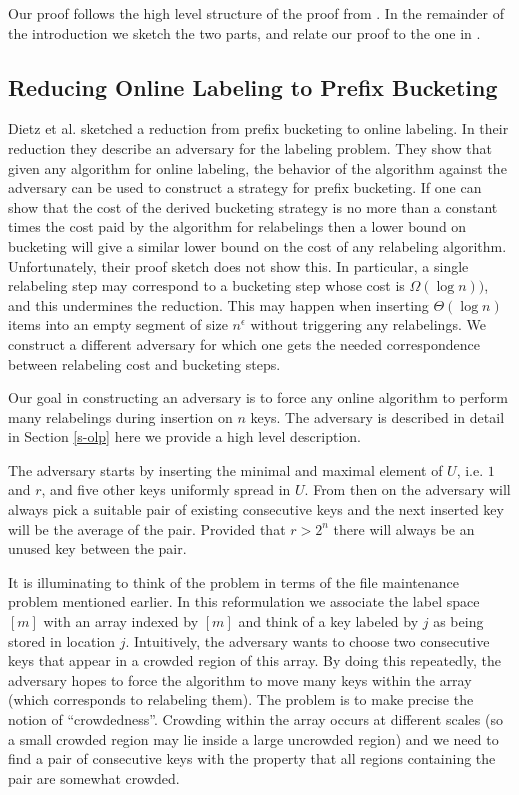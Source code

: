 \documentclass[11pt]{article}
\begin{document}
Our proof follows the high level structure of the proof from \cite{DSZ04}.  In the remainder of the introduction we sketch the two
parts, and relate our proof to the one in \cite{DSZ04}.

\subsection{Reducing Online Labeling to Prefix Bucketing}


Dietz et al. \cite{DSZ04} sketched a reduction from prefix bucketing to online labeling.  In their reduction they describe an adversary
for the labeling problem.  They show that given any algorithm for online labeling, the behavior of the algorithm
against the adversary can be used to construct a strategy for prefix bucketing.  If one can show that the cost of the derived bucketing strategy is no more than a constant times  the cost paid by the algorithm for relabelings then a lower bound on bucketing
will give a similar lower bound on the cost of any relabeling algorithm.  Unfortunately, their proof sketch does not show this.
In particular, a single relabeling step may correspond to a bucketing step whose cost is $\Omega(\log n))$, and this
undermines the reduction.
This may happen when inserting $\Theta(\log n)$ items into an empty segment of size $n^\epsilon$ without triggering any relabelings.
We construct a different adversary for which one gets the needed correspondence
between relabeling cost and bucketing steps.

Our goal in constructing an adversary is to force any online algorithm to perform many relabelings during insertion on $n$ keys.
The adversary is described
in detail in Section \ref{s-olp} here we provide a high level description.

The adversary starts by inserting the minimal and maximal element of $U$, i.e. $1$ and $r$, and five other keys uniformly spread in $U$.
From then on the adversary will always pick a suitable pair of existing consecutive keys and the next inserted key
will be the average of the pair. Provided that $r>2^n$ there will always be an unused key between the pair.


It is illuminating to think of the problem in terms of the file maintenance problem mentioned earlier.
In this reformulation we associate the label space $[m]$ with an array indexed by $[m]$
and think of a key labeled by $j$ as being stored in location $j$.
Intuitively, the adversary wants to choose two consecutive keys that appear in a crowded region of this array.
By doing this repeatedly, the adversary hopes to force the algorithm to move many keys within the array (which corresponds to relabeling them).
The problem is to make precise the notion of ``crowdedness''.
Crowding within the array occurs at different scales (so a small crowded region may lie inside a large uncrowded region)
and we need to find a pair of consecutive keys with the property that all regions containing the pair are somewhat crowded.
\end{document}
